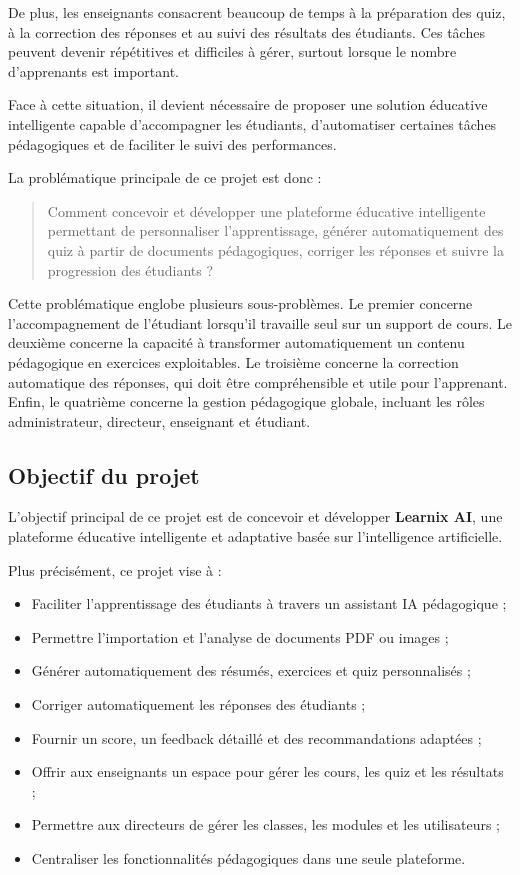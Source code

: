 \documentclass[12pt,a4paper]{report}
\begin{document}
De plus, les enseignants consacrent beaucoup de temps à la préparation des quiz, à la correction des réponses et au suivi des résultats des étudiants. Ces tâches peuvent devenir répétitives et difficiles à gérer, surtout lorsque le nombre d'apprenants est important.

Face à cette situation, il devient nécessaire de proposer une solution éducative intelligente capable d'accompagner les étudiants, d'automatiser certaines tâches pédagogiques et de faciliter le suivi des performances.

La problématique principale de ce projet est donc :

\begin{quote}
Comment concevoir et développer une plateforme éducative intelligente permettant de personnaliser l'apprentissage, générer automatiquement des quiz à partir de documents pédagogiques, corriger les réponses et suivre la progression des étudiants ?
\end{quote}

Cette problématique englobe plusieurs sous-problèmes. Le premier concerne
l'accompagnement de l'étudiant lorsqu'il travaille seul sur un support de cours.
Le deuxième concerne la capacité à transformer automatiquement un contenu
pédagogique en exercices exploitables. Le troisième concerne la correction
automatique des réponses, qui doit être compréhensible et utile pour l'apprenant.
Enfin, le quatrième concerne la gestion pédagogique globale, incluant les rôles
administrateur, directeur, enseignant et étudiant.

\subsection{Objectif du projet}

L'objectif principal de ce projet est de concevoir et développer \textbf{Learnix AI}, une plateforme éducative intelligente et adaptative basée sur l'intelligence artificielle.

Plus précisément, ce projet vise à :

\begin{itemize}
    \item Faciliter l'apprentissage des étudiants à travers un assistant IA pédagogique ;
    \item Permettre l'importation et l'analyse de documents PDF ou images ;
    \item Générer automatiquement des résumés, exercices et quiz personnalisés ;
    \item Corriger automatiquement les réponses des étudiants ;
    \item Fournir un score, un feedback détaillé et des recommandations adaptées ;
    \item Offrir aux enseignants un espace pour gérer les cours, les quiz et les résultats ;
    \item Permettre aux directeurs de gérer les classes, les modules et les utilisateurs ;
    \item Centraliser les fonctionnalités pédagogiques dans une seule plateforme.
\end{itemize}
\end{document}

